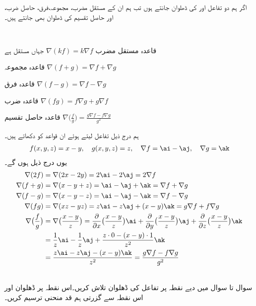 اگر ہم دو تفاعل  اور  کی  ڈھلوان جانتے ہوں تب ہم ان کے مستقل مضرب، مجموعہ،فرق،   حاصل ضرب، اور حاصل تقسیم کی ڈھلوان بھی جانتے ہیں۔ 

\\
\begin{description}
\item{قاعدہ مستقل مضرب}\quad
$\nabla(kf)=k\nabla f$\quad
جہاں  مستقل ہے
\item{قاعدہ مجموعہ}\quad
$\nabla (f+g)=\nabla f+\nabla g$
\item{قاعدہ فرق}\quad
$\nabla (f-g)=\nabla f-\nabla g$
\item{قاعدہ ضرب}\quad
$\nabla (fg)=f\nabla g+g\nabla f$
\item{قاعدہ حاصل تقسیم}\quad
$\nabla\big(\frac{f}{g}\big)=\frac{g\nabla f-f\nabla g}{g^2}$
\end{description}

ہم  درج ذیل تفاعل لیتے ہوئے ان قواعد کو  دکھاتے ہیں۔
\begin{align*}
f(x,y,z)=x-y,\quad g(x,y,z)=z,\quad \nabla f=\ai-\aj,\quad \nabla g=\ak
\end{align*}
یوں درج ذیل ہوں گے۔
\begin{align*}
\nabla(2f)&=\nabla(2x-2y)=2\ai-2\aj=2\nabla f\\
\nabla(f+g)&=\nabla(x-y+z)=\ai-\aj+\ak=\nabla f+\nabla g \\
\nabla(f-g)&=\nabla(x-y-z)=\ai-\aj-\ak=\nabla f-\nabla g\\
\nabla (fg)&=\nabla(xz-yz)=z\ai-z\aj+(x-y)\ak=g\nabla f+f\nabla g\\
\nabla\big(\frac{f}{g}\big)&=\nabla\big(\frac{x-y}{z}\big)=\frac{\partial}{\partial x}\big(\frac{x-y}{z}\big)\ai+\frac{\partial}{\partial y}\big(\frac{x-y}{z}\big)\aj+\frac{\partial}{\partial z}\big(\frac{x-y}{z}\big)\ak\\
&=\frac{1}{z}\ai-\frac{1}{z}\aj+\frac{z\cdot 0-(x-y)\cdot 1}{z^2}\ak\\
&=\frac{z\ai-z\aj-(x-y)\ak}{z^2}=\frac{g\nabla f-f\nabla g}{g^2}
\end{align*}


\\
سوال  تا سوال  میں دیے نقطہ پر تفاعل کی ڈھلوان  تلاش کریں۔اس  نقطہ پر ڈھلوان اور اس نقطہ سے گزرتی   ہم قد منحنی  ترسیم کریں۔

